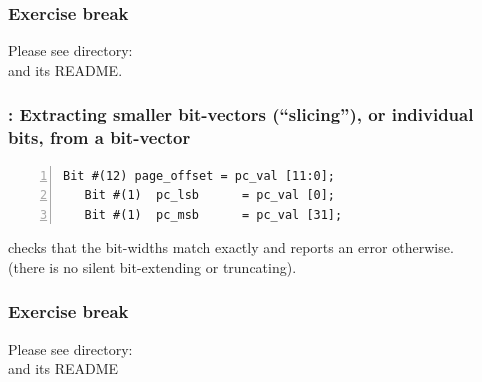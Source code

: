 
\begin{frame}
\frametitle{\EmojiExercise \hmm Exercise break}

Please see directory:  \\
and its README.

\end{frame}


\begin{frame}[fragile]
\frametitle{{\BSV}: Extracting smaller bit-vectors (``slicing''), or individual bits, from a bit-vector}

\footnotesize

\begin{Verbatim}[frame=single, numbers=left]
   Bit #(12) page_offset = pc_val [11:0];
   Bit #(1)  pc_lsb      = pc_val [0];
   Bit #(1)  pc_msb      = pc_val [31];
\end{Verbatim}

\vspace{1ex}

{\bsc} checks that the bit-widths match exactly and reports an error otherwise. \\
(there is no silent bit-extending or truncating).

\end{frame}


\begin{frame}
\frametitle{\EmojiExercise \hmm Exercise break}

Please see directory:  \\
and its README

\end{frame}


